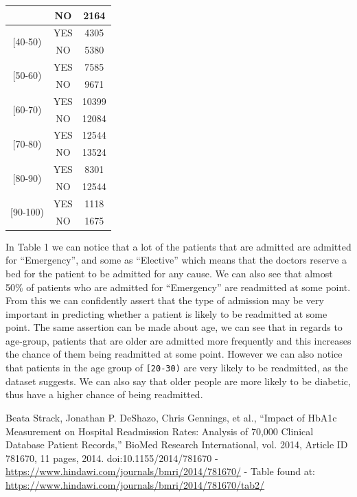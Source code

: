 \documentclass[11pt]{report}
\begin{document}
\begin{table}[!ht]
\begin{minipage}[t]{.5\linewidth}
\begin{tabular}{|c|c|c|}
                               & NO  & 2164  \\ \hline 
\multirow{2}{*}{[40-50)}       & YES & 4305     \\
                               & NO  & 5380    \\ \hline
\multirow{2}{*}{[50-60)}       & YES & 7585  \\
                               & NO  & 9671  \\ \hline
\multirow{2}{*}{[60-70)}       & YES & 10399  \\
                               & NO  & 12084  \\ \hline
\multirow{2}{*}{[70-80)}       & YES & 12544  \\
                               & NO  & 13524  \\ \hline
\multirow{2}{*}{[80-90)}       & YES & 8301  \\
                               & NO  & 12544  \\ \hline
\multirow{2}{*}{[90-100)}      & YES & 1118  \\
                               & NO  & 1675  \\ \hline
\end{tabular}
    \end{minipage} 
\end{table}

\noindent
In Table 1 we can notice that a lot of the patients that are admitted are admitted for ``Emergency'', and some as ``Elective'' which means that the doctors reserve a bed for the patient to be admitted for any cause. We can also see that almost 50\% of patients who are admitted for ``Emergency'' are readmitted at some point. From this we can confidently assert that the type of admission may be very important in predicting whether a patient is likely to be readmitted at some point. The same assertion can be made about age, we can see that in regards to age-group, patients that are older are admitted more frequently and this increases the chance of them being readmitted at some point. However we can also notice that patients in the age group of \texttt{[20-30)} are very likely to be readmitted, as the dataset suggests. We can also say that older people are more likely to be diabetic, thus have a higher chance of being readmitted.



  \begin{thebibliography}{1}

   Beata Strack, Jonathan P. DeShazo, Chris Gennings, et al., “Impact of HbA1c Measurement on Hospital Readmission Rates: Analysis of 70,000 Clinical Database Patient Records,” BioMed Research International, vol. 2014, Article ID 781670, 11 pages, 2014. doi:10.1155/2014/781670 - \url{https://www.hindawi.com/journals/bmri/2014/781670/} - Table found at: \url{https://www.hindawi.com/journals/bmri/2014/781670/tab2/}

  \end{thebibliography}
\end{document}
